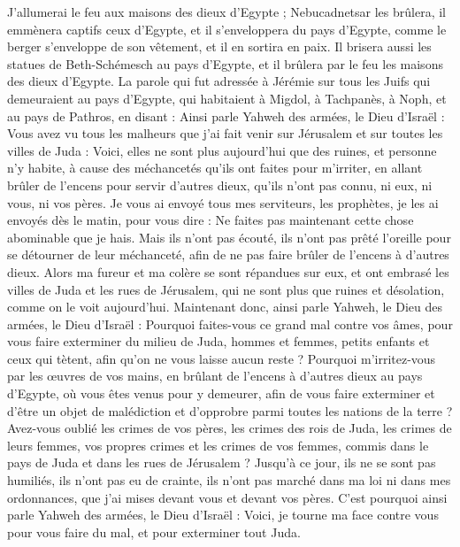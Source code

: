 \begin{multicols}{2}
J'allumerai le feu aux maisons des dieux d'Egypte ; Nebucadnetsar les brûlera, il emmènera captifs ceux d'Egypte, et il s'enveloppera du pays d'Egypte, comme le berger s'enveloppe de son vêtement, et il en sortira en paix.
Il brisera aussi les statues de Beth-Schémesch au pays d'Egypte, et il brûlera par le feu les maisons des dieux d'Egypte.
\VerseOne{}La parole qui fut adressée à Jérémie sur tous les Juifs qui demeuraient au pays d'Egypte, qui habitaient à Migdol, à Tachpanès, à Noph, et au pays de Pathros, en disant :
Ainsi parle Yahweh des armées, le Dieu d'Israël : Vous avez vu tous les malheurs que j'ai fait venir sur Jérusalem et sur toutes les villes de Juda : Voici, elles ne sont plus aujourd'hui que des ruines, et personne n'y habite,
à cause des méchancetés qu'ils ont faites pour m'irriter, en allant brûler de l'encens pour servir d'autres dieux, qu'ils n'ont pas connu, ni eux, ni vous, ni vos pères.
Je vous ai envoyé tous mes serviteurs, les prophètes, je les ai envoyés dès le matin, pour vous dire : Ne faites pas maintenant cette chose abominable que je hais.
Mais ils n'ont pas écouté, ils n'ont pas prêté l'oreille pour se détourner de leur méchanceté, afin de ne pas faire brûler de l'encens à d'autres dieux.
Alors ma fureur et ma colère se sont répandues sur eux, et ont embrasé les villes de Juda et les rues de Jérusalem, qui ne sont plus que ruines et désolation, comme on le voit aujourd'hui.
Maintenant donc, ainsi parle Yahweh, le Dieu des armées, le Dieu d'Israël : Pourquoi faites-vous ce grand mal contre vos âmes, pour vous faire exterminer du milieu de Juda, hommes et femmes, petits enfants et ceux qui tètent, afin qu'on ne vous laisse aucun reste ?
Pourquoi m'irritez-vous par les œuvres de vos mains, en brûlant de l'encens à d'autres dieux au pays d'Egypte, où vous êtes venus pour y demeurer, afin de vous faire exterminer et d'être un objet de malédiction et d'opprobre parmi toutes les nations de la terre ?
Avez-vous oublié les crimes de vos pères, les crimes des rois de Juda, les crimes de leurs femmes, vos propres crimes et les crimes de vos femmes, commis dans le pays de Juda et dans les rues de Jérusalem ?
Jusqu'à ce jour, ils ne se sont pas humiliés, ils n'ont pas eu de crainte, ils n'ont pas marché dans ma loi ni dans mes ordonnances, que j'ai mises devant vous et devant vos pères.
C'est pourquoi ainsi parle Yahweh des armées, le Dieu d'Israël : Voici, je tourne ma face contre vous pour vous faire du mal, et pour exterminer tout Juda.

\end{multicols}
